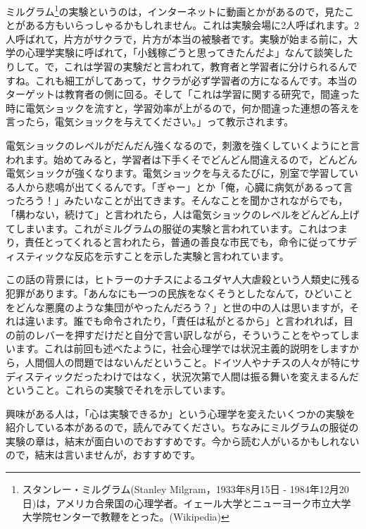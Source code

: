 \documentclass{ltjsbook}
\begin{document}
ミルグラム\footnote{スタンレー・ミルグラム(Stanley Milgram，1933年8月15日 - 1984年12月20日)は，アメリカ合衆国の心理学者。イェール大学とニューヨーク市立大学大学院センターで教鞭をとった。(Wikipedia)}の実験というのは，インターネットに動画とかがあるので，見たことがある方もいらっしゃるかもしれません。これは実験会場に2人呼ばれます。2人呼ばれて，片方がサクラで，片方が本当の被験者です。実験が始まる前に，大学の心理学実験に呼ばれて，「小銭稼ごうと思ってきたんだよ」なんて談笑したりして。で，これは学習の実験だと言われて，教育者と学習者に分けられるんですね。これも細工がしてあって，サクラが必ず学習者の方になるんです。本当のターゲットは教育者の側に回る。そして「これは学習に関する研究で，間違った時に電気ショックを流すと，学習効率が上がるので，何か間違った連想の答えを言ったら，電気ショックを与えてください。」って教示されます。

電気ショックのレベルがだんだん強くなるので，刺激を強くしていくようにと言われます。始めてみると，学習者は下手くそでどんどん間違えるので，どんどん電気ショックが強くなります。電気ショックを与えるたびに，別室で学習している人から悲鳴が出てくるんです。「ぎゃー」とか「俺，心臓に病気があるって言ったろう！」みたいなことが出てきます。そんなことを聞かされながらでも，「構わない，続けて」と言われたら，人は電気ショックのレベルをどんどん上げてしまいます。これがミルグラムの服従の実験と言われています。これはつまり，責任とってくれると言われたら，普通の善良な市民でも，命令に従ってサディスティックな反応を示すことを示した実験と言われています。

この話の背景には，ヒトラーのナチスによるユダヤ人大虐殺という人類史に残る犯罪があります。「あんなにも一つの民族をなくそうとしたなんて，ひどいことをどんな悪魔のような集団がやったんだろう？」と世の中の人は思いますが，それは違います。誰でも命令されたり，「責任は私がとるから」と言われれば，目の前のレバーを押すだけだと自分で言い訳しながら，そういうことをやってしまいます。これは前回も述べたように，社会心理学では状況主義的説明をしますから，人間個人の問題ではないんだということ。ドイツ人やナチスの人々が特にサディスティックだったわけではなく，状況次第で人間は振る舞いを変えまるんだということ。これらの実験でそれを示しています。

興味がある人は，「心は実験できるか」という心理学を変えたいくつかの実験を紹介している本があるので，読んでみてください\parencite{jikken2004}。ちなみにミルグラムの服従の実験の章は，結末が面白いのでおすすめです。今から読む人がいるかもしれないので，結末は言いませんが，おすすめです。
\end{document}
